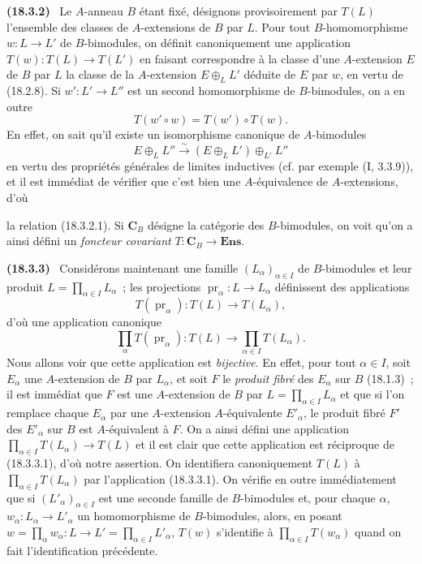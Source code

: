 \documentclass[10pt,oneside]{book}
\makeatletter
\newcommand{\setmanualcurrentlabel}[1]{\def\@currentlabel{#1}}
\newcommand{\oldpage}[2][]{%
  \setcounter{footnote}{0}%
  \marginpar{\scriptsize\textbf{#1}~|~#2}\ignorespaces}
\newenvironment{env}[1][]{\setmanualcurrentlabel{#1}\par\medskip\noindent\textbf{(#1)}\ }{\par}
\makeatother
\begin{document}
\begin{env}[18.3.2]
\label{0.18.3.2-fr}
Le $A$-anneau $B$ étant fixé, désignons provisoirement par $T(L)$ l'ensemble
des classes de $A$-extensions de $B$ par $L$. Pour tout $B$-homomorphisme
$w:L\to L'$ de $B$-bimodules, on définit canoniquement une application
$T(w):T(L)\to T(L')$ en faisant correspondre à la classe d'une $A$-extension
$E$ de $B$ par $L$ la classe de la $A$-extension $E\oplus_LL'$ déduite de $E$
par $w$, en vertu de (18.2.8). Si $w':L'\to L''$ est un second homomorphisme
de $B$-bimodules, on a en outre
\begin{equation}
\label{0.18.3.2.1-fr}
\tag{18.3.2.1}
  T(w'\circ w)=T(w')\circ T(w).
\end{equation}
En effet, on sait qu'il existe un isomorphisme canonique de $A$-bimodules
\[
  E\oplus_LL''\xrightarrow{\sim}(E\oplus_LL')\oplus_{L'}L''
\]
en vertu des propriétés générales de limites inductives (cf. par exemple
($\mathrm{I}$, 3.3.9)), et il est immédiat de vérifier que c'est bien une
$A$-équivalence de $A$-extensions, d'où

\oldpage[0\textsubscript{IV-1}]{60}

la relation (18.3.2.1). Si $\mathbf C_B$ désigne la catégorie des
$B$-bimodules, on voit qu'on a ainsi défini un \emph{foncteur covariant}
$T:\mathbf C_B\to\mathbf{Ens}$.
\end{env}

\begin{env}[18.3.3]
\label{0.18.3.3-fr}
Considérons maintenant une famille $(L_\alpha)_{\alpha\in I}$ de
$B$-bimodules et leur produit $L=\prod_{\alpha\in I}L_\alpha$~; les
projections $\operatorname{pr}_\alpha:L\to L_\alpha$ définissent des
applications
\[
  T(\operatorname{pr}_\alpha):T(L)\to T(L_\alpha),
\]
d'où une application canonique
\begin{equation}
\label{0.18.3.3.1-fr}
\tag{18.3.3.1}
  \prod_\alpha T(\operatorname{pr}_\alpha):T(L)
  \longrightarrow\prod_{\alpha\in I}T(L_\alpha).
\end{equation}
Nous allons voir que cette application est \emph{bijective}. En effet, pour
tout $\alpha\in I$, soit $E_\alpha$ une $A$-extension de $B$ par $L_\alpha$,
et soit $F$ le \emph{produit fibré} des $E_\alpha$ sur $B$ (18.1.3)~; il est
immédiat que $F$ est une $A$-extension de $B$ par
$L=\prod_{\alpha\in I}L_\alpha$ et que si l'on remplace chaque $E_\alpha$ par
une $A$-extension $A$-équivalente $E'_\alpha$, le produit fibré $F'$ des
$E'_\alpha$ sur $B$ est $A$-équivalent à $F$. On a ainsi défini une
application $\prod_{\alpha\in I}T(L_\alpha)\to T(L)$ et il est clair que cette
application est réciproque de (18.3.3.1), d'où notre assertion. On identifiera
canoniquement $T(L)$ à $\prod_{\alpha\in I}T(L_\alpha)$ par l'application
(18.3.3.1). On vérifie en outre immédiatement que si
$(L'_\alpha)_{\alpha\in I}$ est une seconde famille de $B$-bimodules et, pour
chaque $\alpha$, $w_\alpha:L_\alpha\to L'_\alpha$ un homomorphisme de
$B$-bimodules, alors, en posant
$w=\prod_\alpha w_\alpha:L\to L'=\prod_{\alpha\in I}L'_\alpha$, $T(w)$
s'identifie à $\prod_{\alpha\in I}T(w_\alpha)$ quand on fait l'identification
précédente.
\end{env}
\end{document}
